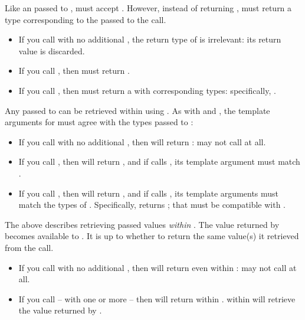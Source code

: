 Like an \entryfn passed to \callcc,  must
accept . However, instead of
returning \cont,  must return a type corresponding to the 
passed to the \resumewith call.

\begin{itemize}
  \item If you call  with no additional ,
  the return type of  is irrelevant: its return value is discarded.
  \item If you call , then 
  must return .
  \item If you call ,
  then  must return a  with corresponding types:
  specifically, .
\end{itemize}

Any  passed to \resumewith can be retrieved within 
using \getdata. As with \callcc and \resume, the template arguments
for \getdata must agree with the types passed to \resumewith:

\begin{itemize}
  \item If you call  with no additional ,
  then \dataavail will return :  may not call \getdata at
  all.
  \item If you call , then \dataavail
  will return , and if  calls \getdata, its template
  argument must match .
  \item If you call ,
  then \dataavail will return , and if  calls \getdata,
  its template arguments must match the types of .
  Specifically,  returns ;
  that  must be compatible
  with .
\end{itemize}

The above describes retrieving passed values \emph{within} . The
value returned by  becomes available to .
It is up to  whether to return the same value(s) it retrieved from
the \resumewith call.

\begin{itemize}
  \item If you call  with no additional ,
  then \dataavail will return  even
  within :  may not call \getdata at all.
  \item If you call  -- with one or
  more  -- then \dataavail will return 
  within . \getdata within  will retrieve
  the value returned by .
\end{itemize}

